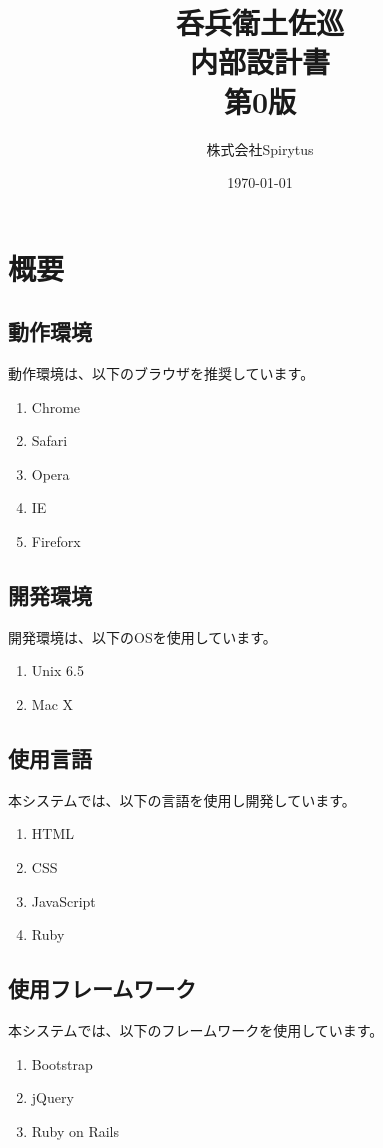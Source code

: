 \documentclass[a4j,titlepage]{jarticle}
\title{呑兵衛土佐巡\\
内部設計書\\
第0版}
\author{株式会社Spirytus}
\date{\today}
\begin{document}
\maketitle
\tableofcontents

\clearpage

\section{概要}
\subsection{動作環境}
動作環境は、以下のブラウザを推奨しています。
\begin{enumerate}
\item Chrome
\item Safari
\item Opera
\item IE
\item Fireforx
\end{enumerate}

\subsection{開発環境}
開発環境は、以下のOSを使用しています。
\begin{enumerate}
\item Unix 6.5
\item Mac X
\end{enumerate}

\subsection{使用言語}
本システムでは、以下の言語を使用し開発しています。
\begin{enumerate}
\item HTML
\item CSS
\item JavaScript
\item Ruby
\end{enumerate}

\subsection{使用フレームワーク}
本システムでは、以下のフレームワークを使用しています。
\begin{enumerate}
\item Bootstrap
\item jQuery
\item Ruby on Rails
\end{enumerate}
\end{document}
